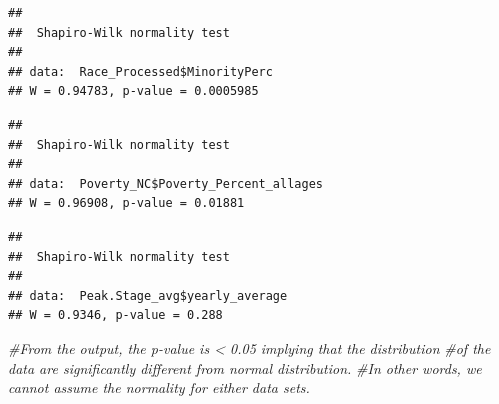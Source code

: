 \documentclass[12pt,]{article}
\newenvironment{Shaded}{\begin{snugshade}}{\end{snugshade}}
\newcommand{\KeywordTok}[1]{\textcolor[rgb]{0.13,0.29,0.53}{\textbf{#1}}}
\newcommand{\DataTypeTok}[1]{\textcolor[rgb]{0.13,0.29,0.53}{#1}}
\newcommand{\StringTok}[1]{\textcolor[rgb]{0.31,0.60,0.02}{#1}}
\newcommand{\CommentTok}[1]{\textcolor[rgb]{0.56,0.35,0.01}{\textit{#1}}}
\newcommand{\OperatorTok}[1]{\textcolor[rgb]{0.81,0.36,0.00}{\textbf{#1}}}
\newcommand{\NormalTok}[1]{#1}
\begin{document}
\begin{verbatim}
## 
##  Shapiro-Wilk normality test
## 
## data:  Race_Processed$MinorityPerc
## W = 0.94783, p-value = 0.0005985
\end{verbatim}

\begin{Shaded}
\end{Shaded}

\begin{verbatim}
## 
##  Shapiro-Wilk normality test
## 
## data:  Poverty_NC$Poverty_Percent_allages
## W = 0.96908, p-value = 0.01881
\end{verbatim}

\begin{Shaded}
\end{Shaded}

\begin{verbatim}
## 
##  Shapiro-Wilk normality test
## 
## data:  Peak.Stage_avg$yearly_average
## W = 0.9346, p-value = 0.288
\end{verbatim}

\begin{Shaded}
\begin{Highlighting}[]
\CommentTok{#From the output, the p-value is < 0.05 implying that the distribution }
\CommentTok{#of the data are significantly different from normal distribution. }
\CommentTok{#In other words, we cannot assume the normality for either data sets.}
\end{Highlighting}
\end{Shaded}
\end{document}
